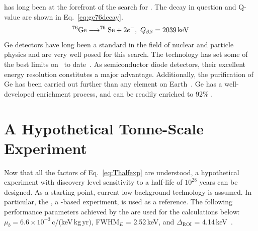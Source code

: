 \geEn{} has long been at the forefront of the search for \novbb{}. The decay in question and Q-value are shown in Eq.~\ref{eq:ge76decay}.
\begin{equation}
	^{76}\text{Ge} \longrightarrow ^{76}\text{Se} + 2e^-,~Q_{\beta\beta} = 2039\text{\,keV}
	\label{eq:ge76decay}
\end{equation}
Ge detectors have long been a standard in the field of nuclear and particle physics and are very well posed for this search. The technology has set some of the best limits on \Thalf~to date~\cite{gerda,mjd_final}. As semiconductor diode detectors, their excellent energy resolution constitutes a major advantage. Additionally, the purification of Ge has been carried out further than any element on Earth~\cite{knoll}. Ge has a well-developed enrichment process, and can be readily enriched to 92\% \geEn{}. 

\section{A Hypothetical Tonne-Scale Experiment}\label{sec:design}

Now that all the factors of Eq.~\ref{eq:Thalfexp} are understood, a hypothetical experiment with discovery level sensitivity to a \novbb{} half-life of $10^{28}$ years can be designed. As a starting point, current low background technology is assumed. In particular, the {\MJDEMit}, a \geEn{}-based experiment, is used as a reference. The following performance parameters achieved by the {\DEMit} are used for the calculations below: $\mu_b = 6.6 \times 10^{-3}$\,c/(keV\,kg\,yr), FWHM$_E$ = 2.52\,keV, and $\Delta_\text{ROI}$ = 4.14\,keV~\cite{mjd_26,mjd_final}.

